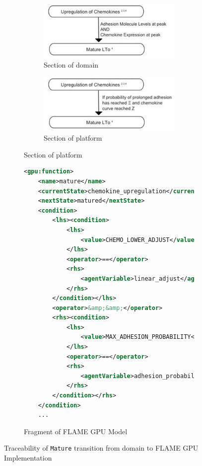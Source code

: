\documentclass{UoYCSproject}
\begin{document}
\begin{figure}[htbp]
\begin{subfigure}{0.5\textwidth}
\begin{subfigure}{\textwidth}
\centering
\includegraphics[width=\textwidth]{Appendix/LTo_Domain_Trace}
\caption{Section of \gls{domain}}
\bigskip
\bigskip
\end{subfigure}

\begin{subfigure}{\textwidth}
\centering
\includegraphics[width=\textwidth]{Appendix/LTo_Platform_Trace}
\caption{Section of \gls{platform}}
\end{subfigure}

\end{subfigure}
\begin{subfigure}{0.5\textwidth}
\begin{lstlisting}[language=XML, basicstyle=\tiny]
<gpu:function>
    <name>mature</name>
    <currentState>chemokine_upregulation</currentState>
    <nextState>matured</nextState>
    <condition>
        <lhs><condition>
            <lhs>
                <value>CHEMO_LOWER_ADJUST</value>
            </lhs>
            <operator>==</operator>
            <rhs>
                <agentVariable>linear_adjust</agentVariable>
            </rhs>
        </condition></lhs>
        <operator>&amp;&amp;</operator>
        <rhs><condition>
            <lhs>
                <value>MAX_ADHESION_PROBABILITY</value>
            </lhs>
            <operator>==</operator>
            <rhs>
                <agentVariable>adhesion_probability</agentVariable>
            </rhs>
        </condition></rhs>
    </condition>
    ...
\end{lstlisting}
\caption{Fragment of \gls{FLAME GPU} Model}
\end{subfigure}
\caption{Traceability of \texttt{Mature} transition from \gls{domain} to \gls{FLAME GPU} Implementation}
\label{fig:traceability_condition}
\end{figure}
\end{document}
